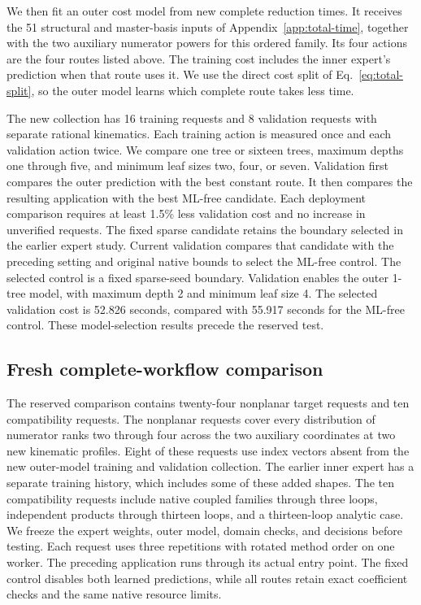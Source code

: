 We then fit an outer cost model from new complete reduction times. It receives the 51 structural and master-basis inputs of Appendix~\ref{app:total-time}, together with the two auxiliary numerator powers for this ordered family. Its four actions are the four routes listed above. The training cost includes the inner expert's prediction when that route uses it. We use the direct cost split of Eq.~\eqref{eq:total-split}, so the outer model learns which complete route takes less time.

The new collection has 16 training requests and 8 validation requests with separate rational kinematics. Each training action is measured once and each validation action twice. We compare one tree or sixteen trees, maximum depths one through five, and minimum leaf sizes two, four, or seven. Validation first compares the outer prediction with the best constant route. It then compares the resulting application with the best ML-free candidate. Each deployment comparison requires at least 1.5\% less validation cost and no increase in unverified requests. The fixed sparse candidate retains the boundary selected in the earlier expert study. Current validation compares that candidate with the preceding setting and original native bounds to select the ML-free control. The selected control is a fixed sparse-seed boundary. Validation enables the outer 1-tree model, with maximum depth 2 and minimum leaf size 4. The selected validation cost is 52.826 seconds, compared with 55.917 seconds for the ML-free control. These model-selection results precede the reserved test.

\subsection{Fresh complete-workflow comparison}
The reserved comparison contains twenty-four nonplanar target requests and ten compatibility requests. The nonplanar requests cover every distribution of numerator ranks two through four across the two auxiliary coordinates at two new kinematic profiles. Eight of these requests use index vectors absent from the new outer-model training and validation collection. The earlier inner expert has a separate training history, which includes some of these added shapes. The ten compatibility requests include native coupled families through three loops, independent products through thirteen loops, and a thirteen-loop analytic case. We freeze the expert weights, outer model, domain checks, and decisions before testing. Each request uses three repetitions with rotated method order on one worker. The preceding application runs through its actual entry point. The fixed control disables both learned predictions, while all routes retain exact coefficient checks and the same native resource limits.

